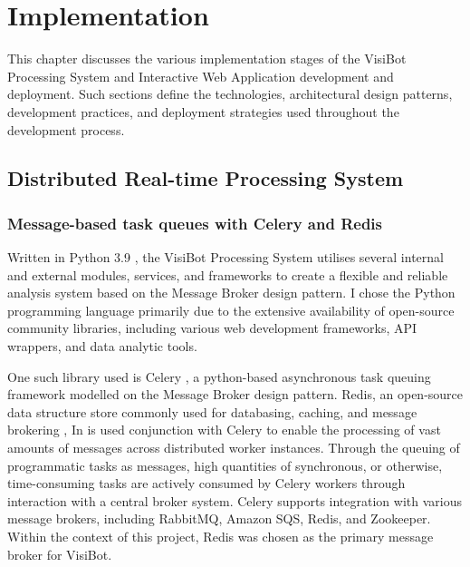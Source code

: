 
\chapter{Implementation}


This chapter discusses the various implementation stages of the VisiBot Processing System and Interactive Web Application development and deployment. Such sections define the technologies, architectural design patterns, development practices, and deployment strategies used throughout the development process.

\section{Distributed Real-time Processing System}

\subsection{Message-based task queues with Celery and Redis}

Written in Python 3.9 \citep{Python39}, the VisiBot Processing System utilises several internal and external modules, services, and frameworks to create a flexible and reliable analysis system based on the Message Broker design pattern. I chose the Python programming language primarily due to the extensive availability of open-source community libraries, including various web development frameworks, API wrappers, and data analytic tools.

One such library used is Celery \citep{Celery}, a python-based asynchronous task queuing framework modelled on the Message Broker design pattern. Redis, an open-source data structure store commonly used for databasing, caching, and message brokering \citep{Redis}, In is used conjunction with Celery to enable the processing of vast amounts of messages across distributed worker instances. Through the queuing of programmatic tasks as messages, high quantities of synchronous, or otherwise, time-consuming tasks are actively consumed by Celery workers through interaction with a central broker system. Celery supports integration with various message brokers, including RabbitMQ, Amazon SQS, Redis, and Zookeeper. Within the context of this project, Redis was chosen as the primary message broker for VisiBot.

